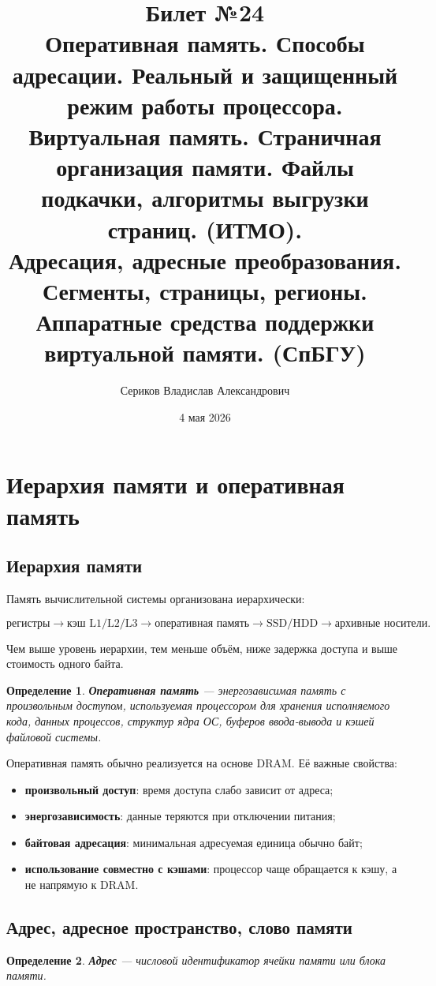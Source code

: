 \documentclass[a4paper,12pt]{article}
\title{Билет №24 \\ \small Оперативная память. Способы адресации. Реальный и защищенный режим работы процессора. Виртуальная память. Страничная организация памяти. Файлы подкачки, алгоритмы выгрузки страниц. (ИТМО). \\ Адресация, адресные преобразования. Сегменты, страницы, регионы. Аппаратные средства поддержки виртуальной памяти. (СпБГУ)}
\author{Сериков Владислав Александрович}
\date{4 мая 2026}
\newtheorem{definition}{Определение}
\begin{document}
\maketitle
\tableofcontents
\newpage

\section{Иерархия памяти и оперативная память}

\subsection{Иерархия памяти}

Память вычислительной системы организована иерархически:

\[
\text{регистры} \rightarrow \text{кэш L1/L2/L3} \rightarrow
\text{оперативная память} \rightarrow \text{SSD/HDD} \rightarrow
\text{архивные носители}.
\]

Чем выше уровень иерархии, тем меньше объём, ниже задержка доступа и выше стоимость одного байта.

\begin{definition}
\textbf{Оперативная память} --- энергозависимая память с произвольным доступом, используемая процессором для хранения исполняемого кода, данных процессов, структур ядра ОС, буферов ввода-вывода и кэшей файловой системы.
\end{definition}

Оперативная память обычно реализуется на основе DRAM. Её важные свойства:

\begin{itemize}
    \item \textbf{произвольный доступ}: время доступа слабо зависит от адреса;
    \item \textbf{энергозависимость}: данные теряются при отключении питания;
    \item \textbf{байтовая адресация}: минимальная адресуемая единица обычно байт;
    \item \textbf{использование совместно с кэшами}: процессор чаще обращается к кэшу, а не напрямую к DRAM.
\end{itemize}

\subsection{Адрес, адресное пространство, слово памяти}

\begin{definition}
\textbf{Адрес} --- числовой идентификатор ячейки памяти или блока памяти.
\end{definition}
\end{document}
